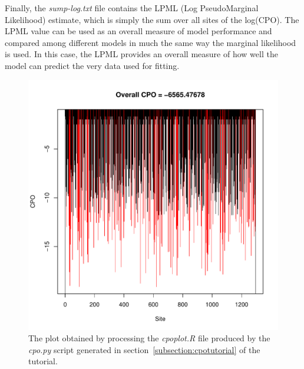 \documentclass[10pt]{article}
\newcommand{\pathname}[1]{{\em #1}}				%
\begin{document}
Finally, the \pathname{sump-log.txt} file contains the LPML (Log PseudoMarginal Likelihood) estimate, which is simply the sum over all sites of the log(CPO). The LPML value can be used as an overall measure of model performance and compared among different models in much the same way the marginal likelihood is used. In this case, the LPML provides an overall measure of how well the model can predict the very data used for fitting.

%
%
\begin{figure}[t]
\begin{center}
\begin{minipage}{5.in}
\hfil\includegraphics[scale=0.6]{images/rplot.pdf}\hfil
\caption{\small The plot obtained by processing the \pathname{cpoplot.R} file produced by the \pathname{cpo.py} script generated in section~\ref{subsection:cpotutorial} of the tutorial.}
\label{rplot}
\end{minipage}
\end{center}
\end{figure}


\end{document}
